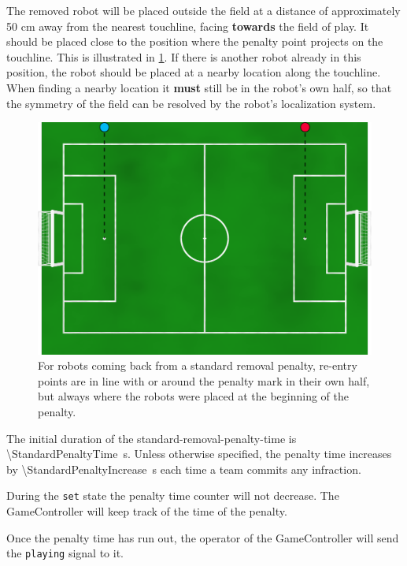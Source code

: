 The removed robot will be placed outside the field at a distance of approximately 50 cm away from the nearest touchline, facing \textbf{towards} the field of play. It should be placed close to the position where the penalty point projects on the touchline. This is illustrated in \cref{fig:penalty_re-entry_points}. If there is another robot already in this position, the robot should be placed at a nearby location along the touchline.
When finding a nearby location it \textbf{must} still be in the robot's own half, so that the symmetry of the field can be resolved by the robot's localization system.

\begin{figure}[t]
    \centerline{\includegraphics[width=\columnwidth]{figs/penalty_re-entry_points_2024.png}}
    \caption{For robots coming back from a standard removal penalty, re-entry points are in line with or around the penalty mark in their own half, but always where the robots were placed at the beginning of the penalty.}
    \label{fig:penalty_re-entry_points}
\end{figure}

The initial duration of the standard-removal-penalty-time is \qty{\StandardPenaltyTime}{\second}.
Unless otherwise specified, the penalty time increases by \qty{\StandardPenaltyIncrease}{\second} each time a team commits any infraction.

During the \texttt{set} state the penalty time counter will not decrease. The GameController will keep track of the time of the penalty.

Once the penalty time has run out, the operator of the GameController will send the \texttt{playing} signal to it.

